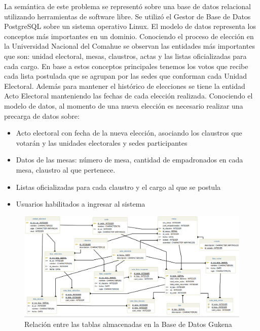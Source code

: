 La semántica de este problema se representó sobre una base de datos relacional utilizando herramientas de software libre. Se utilizó el Gestor de Base de Datos PostgreSQL sobre un sistema operativo Linux. El modelo de datos representa los conceptos más importantes en un dominio. Conociendo el proceso de elección en la Universidad Nacional del Comahue se observan las entidades más importantes que son: unidad electoral, mesas, claustros, actas y las listas oficializadas para cada cargo. En base a estos conceptos principales tenemos los votos que recibe cada lista postulada que se agrupan por las sedes que conforman cada Unidad Electoral. Además para mantener el histórico de elecciones se tiene la entidad Acto Electoral manteniendo las fechas de cada elección realizada.\newline
Conociendo el modelo de datos, al momento de una nueva elección es necesario realizar una precarga de datos sobre:
\begin{itemize}
    \item Acto electoral con fecha de la nueva elección, asociando los claustros que votarán y las unidades electorales y sedes participantes
    \item Datos de las mesas: número de mesa, cantidad de empadronados en cada mesa, claustro al que pertenece.
    \item Listas oficializadas para cada claustro y el cargo al que se postula
    \item Usuarios habilitados a ingresar al sistema
\end{itemize}
\begin{figure}[h!]
  \includegraphics[width=\textwidth]{img/gu_kena_diagramaBD.jpg}
  \caption{Relación entre las tablas almacenadas en la Base de Datos Gukena}
  \label{graf:diagramaBD}
\end{figure}

